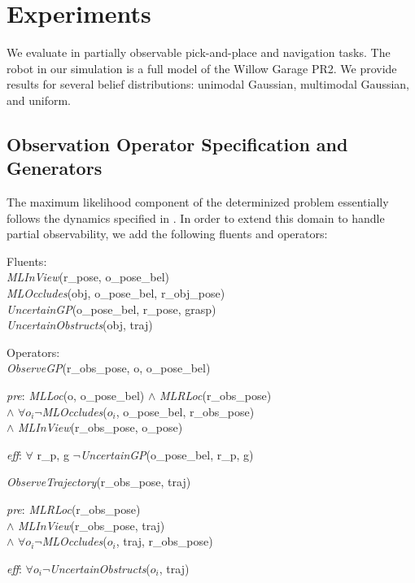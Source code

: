 \section{Experiments}
We evaluate \ibsp{} in partially observable pick-and-place and navigation tasks.
The robot in our simulation is a full model of the Willow Garage PR2. We
provide results for several belief distributions: unimodal Gaussian, multimodal
Gaussian, and uniform.
\subsection{Observation Operator Specification and Generators}
The maximum likelihood component of the determinized problem
essentially follows the dynamics specified in
. In order to extend this domain to handle
partial observability, we add the following fluents and operators:
\begin{tightlist}
  \item[]Fluents: \\\emph{MLInView}(r\_pose, o\_pose\_bel)\\
    \emph{MLOccludes}(obj, o\_pose\_bel, r\_obj\_pose)\\
    \emph{UncertainGP}(o\_pose\_bel, r\_pose, grasp)\\
    \emph{UncertainObstructs}(obj, traj)
  \item[]Operators: \\\emph{ObserveGP}(r\_obs\_pose, o, o\_pose\_bel)
\begin{tightlist}
  \item[\emph{pre}:] \emph{MLLoc}(o, o\_pose\_bel) $\wedge$
    \emph{MLRLoc}(r\_obs\_pose) \\$\wedge$ $\forall o_i
    \lnot$\emph{MLOccludes}($o_i$, o\_pose\_bel, r\_obs\_pose) \\ $\wedge$
    \emph{MLInView}(r\_obs\_pose, o\_pose)
  \item[\emph{eff}:] $\forall$ r\_p, g $\lnot$\emph{UncertainGP}(o\_pose\_bel, r\_p, g)
\end{tightlist}
\emph{ObserveTrajectory}(r\_obs\_pose, traj) 

\begin{tightlist}
  \item[\emph{pre}:] \emph{MLRLoc}(r\_obs\_pose) \\$\wedge$
    \emph{MLInView}(r\_obs\_pose, traj)\\ $\wedge$
    $\forall o_i \lnot$\emph{MLOccludes}($o_i$, traj, r\_obs\_pose)
  \item[\emph{eff}:] $\forall o_i \lnot$\emph{UncertainObstructs}($o_i$,
    traj)
\end{tightlist}
\end{tightlist}

